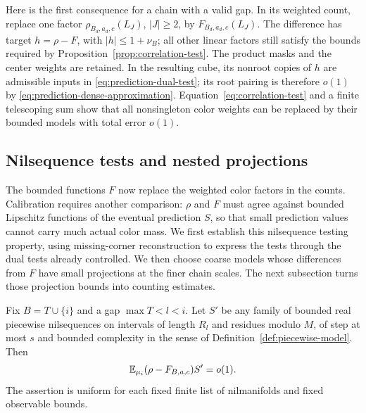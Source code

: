 Here is the first consequence for a chain with a valid gap.  In its
weighted count, replace one factor
$\rho_{B_d,a_d,c}(L_J)$, $|J|\geq2$, by $F_{B_d,a_d,c}(L_J)$.
The difference has target $h=\rho-F$, with $|h|\leq1+\nu_B$;
all other linear factors still satisfy the bounds required by
Proposition~\ref{prop:correlation-test}.  The product masks and the
center weights are retained.  In the resulting cube, its nonroot
copies of $h$ are admissible inputs in
\eqref{eq:prediction-dual-test}; its root pairing is therefore $o(1)$
by \eqref{eq:prediction-dense-approximation}.  Equation~\ref{eq:correlation-test}
and a finite telescoping sum show that all nonsingleton color weights
can be replaced by their bounded models with total error $o(1)$.

\subsection{Nilsequence tests and nested projections}

The bounded functions $F$ now replace the weighted color factors in the
counts.  Calibration requires another comparison: $\rho$ and $F$ must
agree against bounded Lipschitz functions of the eventual prediction
$S$, so that small prediction values cannot carry much actual color
mass.  We first establish this nilsequence testing property, using
missing-corner reconstruction to express the tests through the dual
tests already controlled.  We then choose coarse models whose
differences from $F$ have small projections at the finer chain scales.
The next subsection turns those projection bounds into counting estimates.

\begin{lemma}\label{lem:nilsequence-testing}
Fix $B=T\cup\{i\}$ and a gap $\max T<l<i$.  Let $S'$ be any family
of bounded real piecewise nilsequences on intervals of length $R_l$
and residues modulo $M$, of step at most $s$ and bounded complexity
in the sense of Definition~\ref{def:piecewise-model}.  Then
\begin{equation}\label{eq:prediction-nilsequence-testing}
 \mathbb E_{\mu_i}(\rho-F_{B,a,c})S'=o(1).
\end{equation}
The assertion is uniform for each fixed finite list of nilmanifolds
and fixed observable bounds.
\end{lemma}

